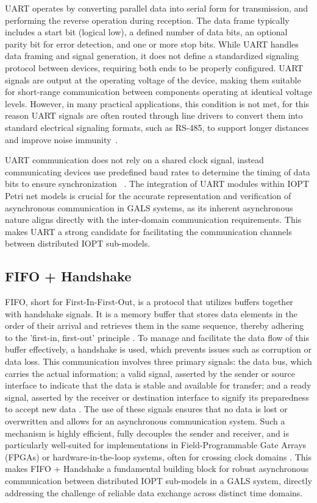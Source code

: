 UART operates by converting parallel data into serial form for transmission, and performing the reverse operation during reception. The data frame typically includes a start bit (logical low), a defined number of data bits, an optional parity bit for error detection, and one or more stop bits. While UART handles data framing and signal generation, it does not define a standardized signaling protocol between devices, requiring both ends to be properly configured. UART signals are output at the operating voltage of the device, making them suitable for short-range communication between components operating at identical voltage levels. However, in many practical applications, this condition is not met, for this reason  UART signals are often routed through line drivers to convert them into standard electrical signaling formats, such as RS-485, to support longer distances and improve noise immunity~\cite{Rao2021}.

UART communication does not rely on a shared clock signal, instead communicating devices use predefined baud rates to determine the timing of data bits to ensure synchronization ~\cite{UARTard}. The integration of UART modules within IOPT Petri net models is crucial for the accurate representation and verification of asynchronous communication in GALS systems, as its inherent asynchronous nature aligns directly with the inter-domain communication requirements. This makes UART a strong candidate for facilitating the communication channels between distributed IOPT sub-models. 




\subsection{FIFO +  Handshake}
\label{sub:fifo+handshake}

FIFO, short for First-In-First-Out, is a protocol that utilizes buffers together with handshake signals. It is a memory buffer that stores data elements in the order of their arrival and retrieves them in the same sequence, thereby adhering to the 'first-in, first-out' principle \cite{wakerly2006}. To manage and facilitate the data flow of this buffer effectively, a handshake is used, which prevents issues such as corruption or data loss. This communication involves three primary signals: the data bus, which carries the actual information; a valid signal, asserted by the sender or source interface to indicate that the data is stable and available for transfer; and a ready signal, asserted by the receiver or destination interface to signify its preparedness to accept new data \cite{arm_axi}. The use of these signals ensures that no data is lost or overwritten and allows for an asynchronous communication system. Such a mechanism is highly efficient, fully decouples the sender and receiver, and is particularly well-suited for implementations in Field-Programmable Gate Arrays (FPGAs) or hardware-in-the-loop systems, often for crossing clock domains \cite{bening2002}. This makes FIFO + Handshake a fundamental building block for robust asynchronous communication between distributed IOPT sub-models in a GALS system, directly addressing the challenge of reliable data exchange across distinct time domains.


